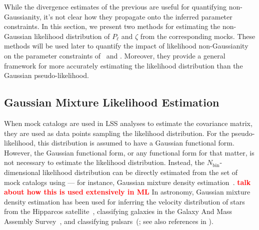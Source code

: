 \documentclass[12pt, letterpaper, preprint]{aastex}
\newcommand{\todo}[1]{{\bf \textcolor{red}{#1}}}
\newcommand{\Beut}{\citetalias{beutler2017}}
\newcommand{\Sinh}{\citetalias{sinha2017a}}
\begin{document}
While the divergence estimates of the previous are useful for 
quantifying non-Gaussianity, it's not clear how they propagate 
onto the inferred parameter constraints. In this section,
we present two methods for estimating the non-Gaussian likelihood 
distribution of $P_\ell$ and $\zeta$ from the corresponding mocks.
These methods will be used later to quantify the impact
of likelihood non-Gaussianity on the parameter constraints of 
\Beut~and \Sinh. Moreover, they provide a general framework for 
more accurately estimating the likelihood distribution than 
the Gaussian pseudo-likelihood. 

\subsection{Gaussian Mixture Likelihood Estimation} \label{sec:gmm}
When mock catalogs are used in LSS analyses to estimate the 
covariance matrix, they are used as data points sampling the 
likelihood distribution. For the pseudo-likelihood, 
this distribution is assumed to have a Gaussian functional form. 
However, the Gaussian functional form, or any functional form for 
that matter, is not necessary to estimate the likelihood distribution. 
Instead, the $N_\mathrm{bin}$-dimensional likelihood distribution 
can be directly estimated from the set of mock catalogs using --- for 
instance, Gaussian mixture density estimation~\citep{9780471006268}. 
\todo{talk about how this is used extensively in ML} 
In astronomy, Gaussian mixture density estimation has been used for 
inferring the velocity distribution of stars from the Hipparcos 
satellite~\citep{bovy2011}, classifying galaxies in the Galaxy And Mass Assembly 
Survey~\cite{taylor2015}, and classifying pulsars~(\cite{lee2012}; see
also references in \cite{kuhn2017}). 
\end{document}

